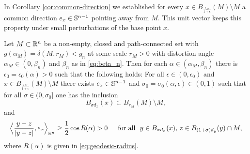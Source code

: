  In Corollary \ref{cor:common-direction} we established for every $x\in
 B_{\frac{r_M}{1+\epsilon}}(M)\setminus M$ a common direction $e_x\in\S^{n-1}$
 pointing away from $M$. This unit vector keeps this property under small
 perturbations of the base point $x$.
 \begin{corollary}
 \label{cor:loc-unif-common-direction}
Let $M\subset\R^n$ be a non-empty, closed and path-connected set with
$g(\alpha_M)=\delta(M,r_M)<g_n$ at some scale $r_M>0$ with distortion angle
$\alpha_M\in (0,\beta_n)$ and $\beta_n$ as in \eqref{eq:beta_n}.
 Then for each $\alpha\in (\alpha_M,\beta_n)$ there is $\epsilon_0=\epsilon_0(\alpha)>0$
such that the following holds: For all $\epsilon\in (0,\epsilon_0)$ and
$x\in B_{\frac{r_M}{1+\epsilon}}(M)\setminus M$ there exists $e_x\in\S^{n-1}$ and
$\sigma_0=\sigma_0(\alpha,\epsilon)\in (0,1)$ 
such that for all $\sigma\in (0,\sigma_0]$
one has the inclusion
\begin{equation}\label{eq:ball-inclusion}
B_{\sigma d_x}(x)\subset B_{r_M}(M)\setminus M,
\end{equation} and 
\begin{equation}\label{eq:unif-common-direction}
\Big\langle \frac{y-z}{|y-z|},e_x\Big\rangle_{\R^n}\ge \frac12 \cos R(\alpha)>0
\quad\Foa y\in B_{\sigma d_x}(x),
\,z\in B_{(1+\sigma)d_y}(y)\cap M,
\end{equation}
where $R(\alpha)$ is given in \eqref{eq:geodesic-radius}.
 \end{corollary}
